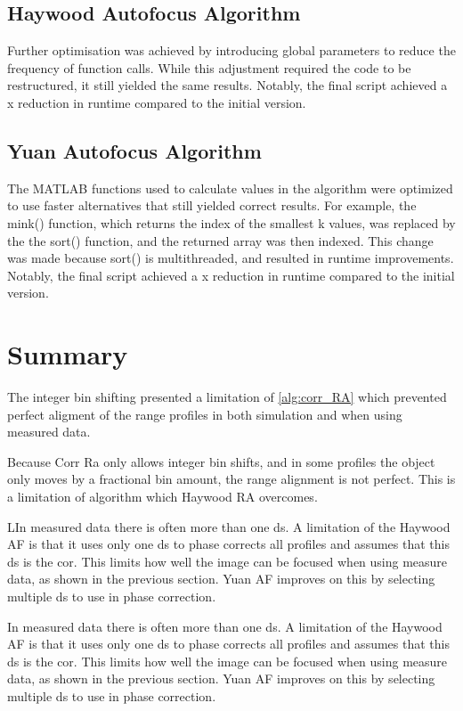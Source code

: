\documentclass[class=report,11pt,crop=false]{standalone}
\begin{document}
    \subsection{Haywood Autofocus Algorithm}
    Further optimisation was achieved by introducing global parameters to reduce the frequency of function calls. While this adjustment required the code to be restructured, it still yielded the same results. Notably, the final script achieved a x reduction in runtime compared to the initial version.

    \subsection{Yuan Autofocus Algorithm}
    The \textsc{MATLAB} functions used to calculate values in the algorithm were optimized to use faster alternatives that still yielded correct results. For example, the mink() function, which returns the index of the smallest k values, was replaced by the the sort() function, and the returned array was then indexed. This change was made because sort() is multithreaded, and resulted in runtime improvements. Notably, the final script achieved a x reduction in runtime compared to the initial version.
    
\section{Summary}
The integer bin shifting presented a limitation of \autoref{alg:corr_RA} which prevented perfect aligment of the range profiles in both simulation and when using measured data.

Because Corr Ra only allows integer bin shifts, and in some profiles the object only moves by a fractional bin amount, the range alignment is not perfect. This is a limitation of algorithm which Haywood RA overcomes.

LIn measured data there is often more than one \gls{ds}. A limitation of the Haywood AF is that it uses only one \gls{ds} to phase corrects all profiles and assumes that this \gls{ds} is the cor. This limits how well the image can be focused when using measure data, as shown in the previous section. Yuan AF improves on this by selecting multiple \gls{ds} to use in phase correction.

In measured data there is often more than one \gls{ds}. A limitation of the Haywood AF is that it uses only one \gls{ds} to phase corrects all profiles and assumes that this \gls{ds} is the cor. This limits how well the image can be focused when using measure data, as shown in the previous section. Yuan AF improves on this by selecting multiple \gls{ds} to use in phase correction.
\ifstandalone

\printnoidxglossary[type=\acronymtype,nonumberlist]
\fi
\end{document}
